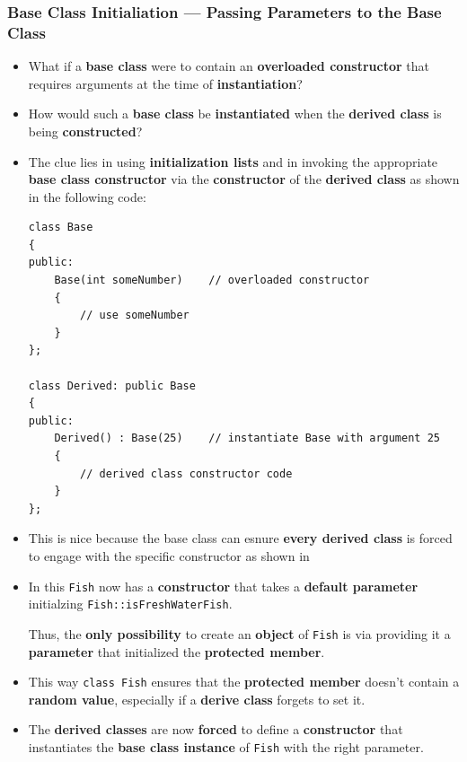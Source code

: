\documentclass[10pt]{article}
\begin{document}
\subsubsection{Base Class Initialiation --- Passing Parameters to the Base Class}
\begin{itemize}
	\item What if a \textbf{base class} were to contain an \textbf{overloaded constructor} that requires arguments at the time of \textbf{instantiation}?

	\item How would such a \textbf{base class} be \textbf{instantiated} when the \textbf{derived class} is being \textbf{constructed}?

	\item The clue lies in using \textbf{initialization lists} and in invoking the appropriate \textbf{base class constructor} via the \textbf{constructor} of the \textbf{derived class} as shown in the following code:

		\begin{verbatim}
class Base
{
public:
	Base(int someNumber)	// overloaded constructor
	{
		// use someNumber
	}
};

class Derived: public Base 
{
public:
	Derived() : Base(25)	// instantiate Base with argument 25
	{
		// derived class constructor code
	}
};
		\end{verbatim}

	\item This is nice because the base class can esnure \textbf{every derived class} is forced to engage with the specific constructor as shown in 

	\item In this \verb|Fish| now has a \textbf{constructor} that takes a \textbf{default parameter} initialzing \verb|Fish::isFreshWaterFish|.

		Thus, the \textbf{only possibility} to create an \textbf{object} of \verb|Fish| is via providing it a \textbf{parameter} that initialized the \textbf{protected member}.

	\item This way \verb|class Fish| ensures that the \textbf{protected member} doesn't contain a \textbf{random value}, especially if a \textbf{derive class} forgets to set it.

\item The \textbf{derived classes} are now \textbf{forced} to define a \textbf{constructor} that instantiates the \textbf{base class instance} of \verb|Fish| with the right parameter.
\end{itemize}
\end{document}
